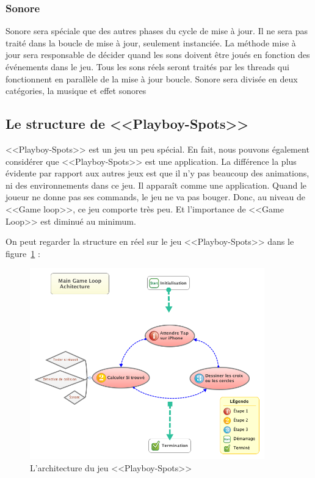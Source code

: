 
\subsubsection{Sonore} %
\label{ssub:sonore}

Sonore sera spéciale que des autres phases du cycle de mise à jour. Il ne sera pas traité dans la boucle de mise à jour, seulement instanciée. La méthode mise à jour sera responsable de décider quand les sons doivent être joués en fonction des événements dans le jeu. Tous les sons réels seront traités par les threads qui fonctionnent en parallèle de la mise à jour boucle. Sonore sera divisée en deux catégories, la musique et effet sonores



\subsection{Le structure de <<Playboy-Spots>>} %
\label{sub:le_structure_de_playboy_spots_}

<<Playboy-Spots>> est un jeu un peu spécial. En fait, nous pouvons également considérer que <<Playboy-Spots>> est une application. La différence la plus évidente par rapport aux autres jeux est que il n'y pas beaucoup des animations, ni des environnements dans ce jeu. Il apparaît comme une application. Quand le joueur ne donne pas ses commands, le jeu ne va pas bouger. Donc, au niveau de <<Game loop>>, ce jeu comporte très peu. Et l'importance de <<Game Loop>> est diminué au minimum. 

On peut regarder la structure en réel sur le jeu <<Playboy-Spots>> dans le figure~\ref{fig:XMinds_AchitecturePlayboy} :
\begin{figure}[htbp]
	\centering
		\includegraphics[width=4in]{XMinds/AchitecturePlayboy.png}
	\caption{L'architecture du jeu <<Playboy-Spots>>}
	\label{fig:XMinds_AchitecturePlayboy}
\end{figure}
 

